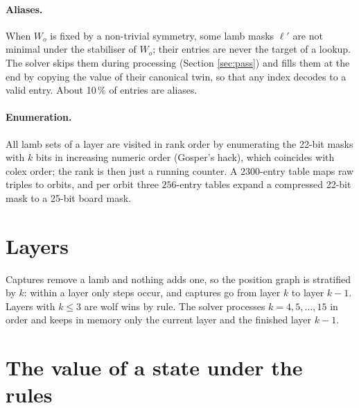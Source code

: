 \documentclass[11pt,a4paper]{article}
\begin{document}
\paragraph{Aliases.} When $W_o$ is fixed by a non-trivial symmetry, some lamb
masks $\ell'$ are not minimal under the stabiliser of $W_o$; their entries are
never the target of a lookup. The solver skips them during processing (Section
\ref{sec:pass}) and fills them at the end by copying the value of their canonical
twin, so that any index decodes to a valid entry. About 10\,\% of entries are
aliases.

\paragraph{Enumeration.} All lamb sets of a layer are visited in rank order by
enumerating the 22-bit masks with $k$ bits in increasing numeric order (Gosper's
hack), which coincides with colex order; the rank is then just a running counter.
A $2300$-entry table maps raw triples to orbits, and per orbit three
$256$-entry tables expand a compressed 22-bit mask to a 25-bit board mask.

\section{Layers}

Captures remove a lamb and nothing adds one, so the position graph is stratified
by $k$: within a layer only steps occur, and captures go from layer $k$ to layer
$k-1$. Layers with $k\le3$ are wolf wins by rule. The solver processes
$k=4,5,\dots,15$ in order and keeps in memory only the current layer and the
finished layer $k-1$.

\section{The value of a state under the rules}\label{sec:value}
\end{document}
